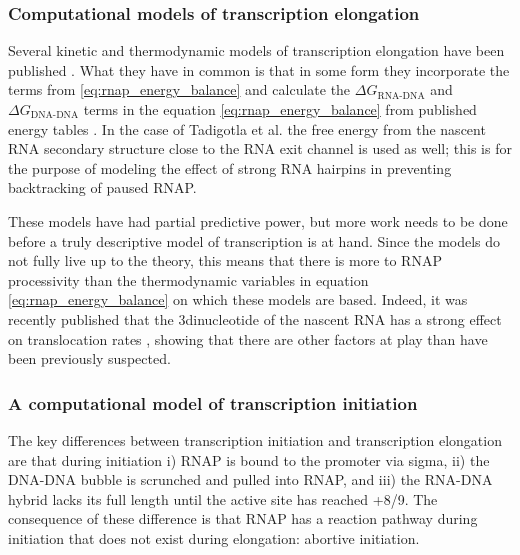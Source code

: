 \subsubsection{Computational models of transcription elongation}
Several kinetic and thermodynamic models of transcription elongation have been
published \cite{tadigotla_thermodynamic_2006, bai_sequence-dependent_2004,
guajardo_model_1997}. What they have in common is that in some form they
incorporate the terms from \eqref{eq:rnap_energy_balance} and calculate the
$\Delta G_{\text{RNA-DNA}}$ and $\Delta G_{\text{DNA-DNA}}$ terms in the
equation \eqref{eq:rnap_energy_balance} from published energy tables
\cite{wu_temperature_2002, santalucia_thermodynamics_2004}. In the case of
Tadigotla et al. \cite{tadigotla_thermodynamic_2006} the free energy from the
nascent RNA secondary structure close to the RNA exit channel is used as well;
this is for the purpose of modeling the effect of strong RNA hairpins in
preventing backtracking of paused RNAP.

These models have had partial predictive power, but more work needs to be done
before a truly descriptive model of transcription is at hand. Since the models
do not fully live up to the theory, this means that there is more to RNAP
processivity than the thermodynamic variables in equation
\eqref{eq:rnap_energy_balance} on which these models are based. Indeed, it was
recently published that the 3\p dinucleotide of the nascent RNA has a strong
effect on translocation rates \cite{hein_rna_2011}, showing that there are
other factors at play than have been previously suspected.

\subsubsection{A computational model of transcription initiation}
The key differences between transcription initiation and transcription
elongation are that during initiation i) RNAP is bound to the promoter via
sigma, ii) the DNA-DNA bubble is scrunched and pulled into RNAP, and iii) the
RNA-DNA hybrid lacks its full length until the active site has reached +8/9.
The consequence of these difference is that RNAP has a reaction pathway during
initiation that does not exist during elongation: abortive initiation.

